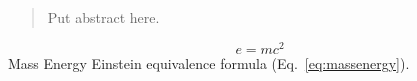 \documentclass[twoside,a4paper,10pt]{article}
\begin{document}
\begin{abstract}
Put abstract here.
\end{abstract}

\begin{equation}
e = mc^2
\label{eq:massenergy}
\end{equation}
Mass Energy Einstein equivalence formula (Eq.~\ref{eq:massenergy}).
\end{document}
